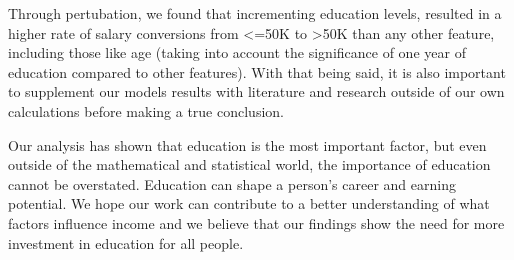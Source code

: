 \documentclass{article}
\begin{document}
Through pertubation, we found that incrementing education levels, resulted in a higher rate of salary conversions from <=50K to >50K than any other feature, including those like age (taking into account the significance of one year of education compared to other features). With that being said, it is also important to supplement our models results with literature and research outside of our own calculations before making a true conclusion. 

Our analysis has shown that education is the most important factor, but even outside of the mathematical and statistical world, the importance of education cannot be overstated. Education can shape a person's career and earning potential. We hope our work can contribute to a better understanding of what factors influence income and we believe that our findings show the need for more investment in education for all people. 






\end{document}

